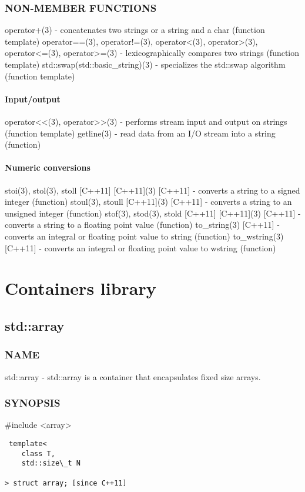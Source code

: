 \subsubsection{NON-MEMBER FUNCTIONS}
operator+(3) - concatenates two strings or a string and a char   (function template)
operator==(3), operator!=(3), operator<(3), operator>(3), operator<=(3), operator>=(3) - lexicographically compares two strings   (function template)
std::swap(std::basic\_string)(3) - specializes the std::swap algorithm  (function template)
\paragraph{Input/output}
operator<<(3), operator>>(3) - performs stream input and output on strings   (function template)
getline(3) - read data from an I/O stream into a string  (function)
\paragraph{Numeric conversions}
stoi(3), stol(3), stoll [C++11] [C++11](3) [C++11] - converts a string to a signed integer   (function)
stoul(3), stoull [C++11](3) [C++11] - converts a string to an unsigned integer   (function)
stof(3), stod(3), stold [C++11] [C++11](3) [C++11] - converts a string to a floating point value   (function)
to\_string(3) [C++11] - converts an integral or floating point value to string   (function)
to\_wstring(3) [C++11] - converts an integral or floating point value to wstring   (function)


\section{Containers library}

\subsection{std::array}

\subsubsection{NAME}
std::array - std::array is a container that encapsulates fixed size arrays.

\subsubsection{SYNOPSIS}
\#include <array>

\begin{lstlisting}
 template<
    class T,
    std::size\_t N

> struct array; [since C++11]
\end{lstlisting}

